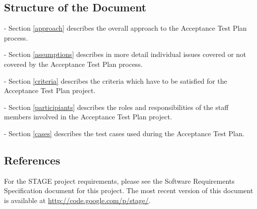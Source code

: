 \documentclass[titlepage]{article}
\begin{document}
\subsection{Structure of the Document%
    \label{structure}%
}
    \begin{itemize*}
        \item[-]Section \ref{approach} describes the overall approach to the Acceptance Test Plan process.
        \item[-]Section \ref{assumptions} describes in more detail individual issues covered or not covered by the Acceptance Test Plan process.
        \item[-]Section \ref{criteria} describes the criteria which have to be satisfied for the Acceptance Test Plan project.
        \item[-]Section \ref{participiants} describes the roles and responsibilities of the staff members involved in the Acceptance Test Plan project.
        \item[-]Section \ref{cases} describes the test cases used during the Acceptance Test Plan.
    \end{itemize*}


\subsection{References%
    \label{references}%
}
    For the STAGE project requirements, please see the Software Requirements Specification document for this project. The most recent version of this document is available at \url{http://code.google.com/p/stage/}.

\end{document}
